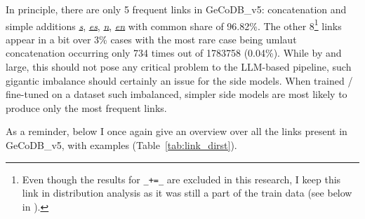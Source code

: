 \documentclass[11pt]{article}
\begin{document}
In principle, there are only 5 frequent links in GeCoDB\_v5: concatenation and simple additions \textit{\underline{s}}, \textit{\underline{es}}, \textit{\underline{n}}, \textit{\underline{en}} with common share of 96.82\%. The other 8\footnote{Even though the results for \texttt{\_+=\_} are excluded in this research, I keep this link in distribution analysis as it was still a part of the train data (see below in ).} links appear in a bit over 3\% cases with the most rare case being umlaut concatenation occurring only 734 times out of 1783758 (0.04\%). While by and large, this should not pose any critical problem to the LLM-based pipeline, such gigantic imbalance should certainly an issue for the side models. When trained / fine-tuned on a dataset such imbalanced, simpler side models are most likely to produce only the most frequent links.

As a reminder, below I once again give an overview over all the links present in GeCoDB\_v5, with examples (Table~\ref{tab:link_dirst}). 
\end{document}
